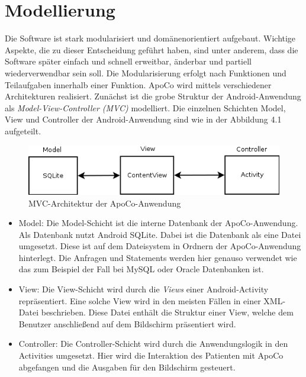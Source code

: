 

\section{Modellierung}

Die Software ist stark modularisiert und dom\"anenorientiert aufgebaut.
Wichtige Aspekte, die zu dieser Entscheidung gef\"uhrt haben, sind unter anderem,
dass die Software sp\"ater einfach und schnell erweitbar, \"anderbar und partiell wiederverwendbar sein soll.
Die Modularisierung erfolgt nach Funktionen und Teilaufgaben innerhalb einer Funktion.
ApoCo wird mittels verschiedener Architekturen realisiert.
Zun\"achst ist die grobe Struktur der Android-Anwendung als \emph{Model-View-Controller (MVC)} modelliert.
Die einzelnen Schichten Model, View und Controller der Android-Anwendung sind wie in der Abbildung 4.1 aufgeteilt.\\

\begin{figure}[h]
  \centering
  \includegraphics[scale=0.7]{diagramme/kapitel4/MVC.png}
  \caption{MVC-Architektur der ApoCo-Anwendung}
 
\end{figure}

\begin{itemize}
 \item Model: Die Model-Schicht ist die interne Datenbank der ApoCo-Anwendung.
 Als Datenbank nutzt Android SQLite.
 Dabei ist die Datenbank als eine Datei umgesetzt.
 Diese ist auf dem Dateisystem in Ordnern der ApoCo-Anwendung hinterlegt.
 Die Anfragen und Statements werden hier genauso verwendet wie das zum Beispiel der Fall bei MySQL oder Oracle Datenbanken ist.
 
 \item View: Die View-Schicht wird durch die \emph{Views} einer Android-Activity repr\"asentiert.
 Eine solche View wird in den meisten F\"allen in einer XML-Datei beschrieben.
 Diese Datei enth\"alt die Struktur einer View, welche dem Benutzer anschlie\ss{}end auf dem Bildschirm pr\"asentiert wird.
  
 \item Controller: Die Controller-Schicht wird durch die Anwendungslogik in den Activities umgesetzt.
 Hier wird die Interaktion des Patienten mit ApoCo abgefangen und die Ausgaben f\"ur den Bildschirm gesteuert.
\end{itemize}


